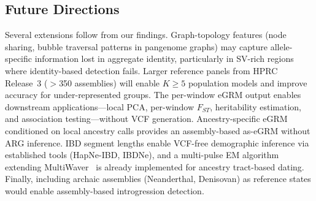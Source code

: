 \subsection{Future Directions}

Several extensions follow from our findings. Graph-topology features (node sharing, bubble traversal patterns in pangenome graphs) may capture allele-specific information lost in aggregate identity, particularly in SV-rich regions where identity-based detection fails. Larger reference panels from HPRC Release~3 ($>$350 assemblies) will enable $K \geq 5$ population models and improve accuracy for under-represented groups. The per-window eGRM output enables downstream applications---local PCA, per-window $F_{ST}$, heritability estimation, and association testing---without VCF generation. Ancestry-specific eGRM~\cite{tang2025asegrm} conditioned on local ancestry calls provides an assembly-based as-eGRM without ARG inference. IBD segment lengths enable VCF-free demographic inference via established tools (HapNe-IBD, IBDNe), and a multi-pulse EM algorithm extending MultiWaver~\cite{ni2018multiwaver} is already implemented for ancestry tract-based dating. Finally, including archaic assemblies (Neanderthal, Denisovan) as reference states would enable assembly-based introgression detection.

